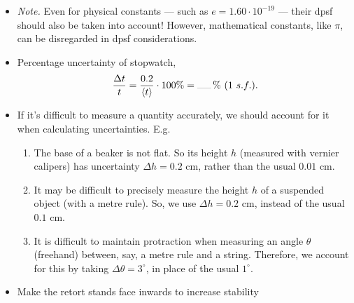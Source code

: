 \documentclass[oneside]{book}
\begin{document}
\begin{itemize}
    \item \emph{Note.} Even for physical constants --- such as \(e=1.60\cdot 10^{-19}\) --- their dpsf should also be taken into account! However, mathematical constants, like \(\pi\), can be disregarded in dpsf considerations. 
    \item Percentage uncertainty of stopwatch,
    \[\frac{\Delta t}{t}=\frac{0.2}{\langle t \rangle}\cdot 100\%=\rule{0.5cm}{0.05mm}\,\%\ (1\ s.f.).\]
    \item If it's difficult to measure a quantity accurately, we should account for it when calculating uncertainties. E.g. 
    \begin{enumerate}
        \item The base of a beaker is not flat. So its height \(h\) (measured with vernier calipers) has uncertainty \(\Delta h=0.2\) cm, rather than the usual \(0.01\) cm.
        \item It may be difficult to precisely measure the height \(h\) of a suspended object (with a metre rule). So, we use \(\Delta h=0.2\) cm, instead of the usual \(0.1\) cm. 
        \item It is difficult to maintain protraction when measuring an angle \(\theta\) (freehand) between, say, a metre rule and a string. Therefore, we account for this by taking \(\Delta\theta=3^\circ\), in place of the usual \(1^\circ\).
    \end{enumerate}
    \item Make the retort stands face inwards to increase stability
\end{itemize}
\end{document}
